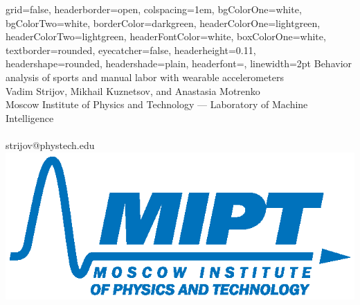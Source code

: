 \documentclass[a0paper,portrait]{baposter}
\begin{document}

\begin{poster}
{
grid=false,
headerborder=open, %
colspacing=1em, %
bgColorOne=white, %
bgColorTwo=white, %
borderColor=darkgreen, %
headerColorOne=lightgreen, %
headerColorTwo=lightgreen, %
headerFontColor=white, %
boxColorOne=white, %
textborder=rounded, %
eyecatcher=false, %
headerheight=0.11\textheight, %
headershape=rounded, %
headershade=plain,
headerfont=\Large\textsf, %
linewidth=2pt %
}
{}
%
%
{
\textsf %
{Behavior analysis of sports and manual labor with wearable accelerometers
}
}            
{\sf\vspace{0.2em}\\
Vadim Strijov, Mikhail Kuznetsov, and Anastasia Motrenko 
\vspace{0.1em}\\
\small{ Moscow Institute of Physics and Technology --- 
Laboratory of Machine Intelligence\\
\vspace{0.2em}\\
strijov@phystech.edu}
}
{\includegraphics[width=.22\textheight]{eng_text}} %


\end{poster}
\end{document}
